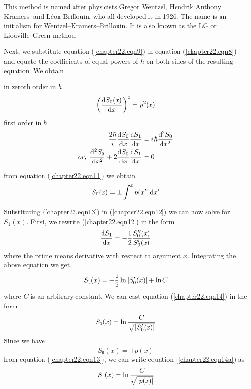 This method is named after physicists Gregor Wentzel, Hendrik Anthony Kramers, and Léon Brillouin, who all developed it in 1926. The name is an initialism for Wentzel–Kramers–Brillouin. It is also known as the LG or Liouville–Green method.


Next, we substitute equation (\ref{chapter22.eqn9}) in equation (\ref{chapter22.eqn8}) and equate the coefficients of equal powers of $\hbar$ on both sides of the resulting equation. We obtain

in zeroth order in $\hbar$
\begin{equation}
\label{chapter22.eqn11}
\qty(\dv{S_0(x)}{x})^2 = p^2(x)
\end{equation}
first order in $\hbar$
\begin{align}
	\frac{2 \hbar}{\iu} \dv{S_0}{x} \dv{S_1}{x} &= \iu \hbar \dv[2]{S_0}{x} \nonumber \\
	or, \ 
	\label{chapter22.eqn12}
	\dv[2]{S_0}{x} + 2 \dv{S_0}{x} \dv{S_1}{x} &= 0 
\end{align}

from equation (\ref{chapter22.eqn11}) we obtain
\begin{equation}
\label{chapter22.eqn13}
S_0\qty(x) = \pm \int^{x} p(x^\prime) \dd{x^\prime}
\end{equation}

Substituting (\ref{chapter22.eqn13}) in (\ref{chapter22.eqn12}) we can now solve for $S_1(x)$. First, we rewrite (\ref{chapter22.eqn12}) in the form
\begin{equation}
	\dv{S_1}{x} = - \frac{1}{2} \frac{S^{\prime\prime}_0(x)}{S^\prime_0(x)}
\end{equation}
where the prime means derivative with respect to argument $x$. Integrating the above equation we get
\begin{equation}
\label{chapter22.eqn14}
	S_1(x) = - \frac{1}{2} \ln \abs{S^\prime_0(x)} + \ln C
\end{equation}
where $C$ is an arbitrary constant. We can cast equation (\ref{chapter22.eqn14}) in the form
\begin{equation}
\label{chapter22.eqn14a}
	S_1(x) = \ln \frac{C}{\sqrt{\abs{S^\prime_0(x)}}}
\end{equation}
Since we have
\begin{equation}
S^\prime_0(x) = \pm p(x)
\end{equation}
from equation (\ref{chapter22.eqn13}), we can write equation (\ref{chapter22.eqn14a}) as
\begin{equation}
\label{chapter22.eqn15}
	S_1(x) = \ln \frac{C}{\sqrt{\abs{p(x)}}}
\end{equation}

